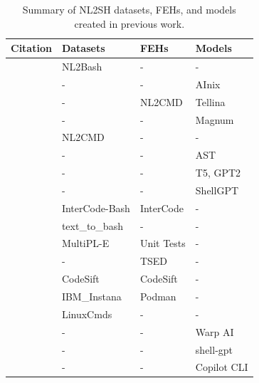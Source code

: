 \documentclass[11pt]{article}
\begin{document}
\begin{table}[ht!]
  \scriptsize
  \setlength{\tabcolsep}{2pt}
  \centering
  \caption{Summary of NL2SH datasets, FEHs, and models created in previous work.}
  \begin{tabular}{llll}
    \hline
    \textbf{Citation}       & \textbf{Datasets} & \textbf{FEHs} & \textbf{Models}  \\ \hline
    \citet{NL2Bash}         & NL2Bash           & -             & -                \\
    \citet{AInix}           & -                 & -             & AInix            \\
    \citet{NL2CMD-Comp}     & -                 & NL2CMD        & Tellina          \\
    \citet{Magnum}          & -                 & -             & Magnum           \\
    \citet{dataset2}        & NL2CMD            & -             & -                \\
    \citet{AST}             & -                 & -             & AST              \\
    \citet{finetune}        & -                 & -             & T5, GPT2         \\
    \citet{ShellGPT}        & -                 & -             & ShellGPT         \\
    \citet{InterCode}       & InterCode-Bash    & InterCode     & -                \\
    \citet{dataset4}        & text\_to\_bash    & -             & -                \\
    \citet{multiple}        & MultiPL-E         & Unit Tests    & -                \\
    \citet{tsed}            & -                 & TSED          & -                \\
    \citet{codesift}        & CodeSift          & CodeSift      & -                \\
    \citet{exec_based_eval} & IBM\_Instana      & Podman        & -                \\
    \citet{dataset3}        & LinuxCmds         & -             & -                \\
    \citet{warp}            & -                 & -             & Warp AI          \\
    \citet{shell-gpt}       & -                 & -             & shell-gpt        \\
    \citet{copilot}         & -                 & -             & Copilot CLI      \\

\end{tabular}
\end{table}
\end{document}
